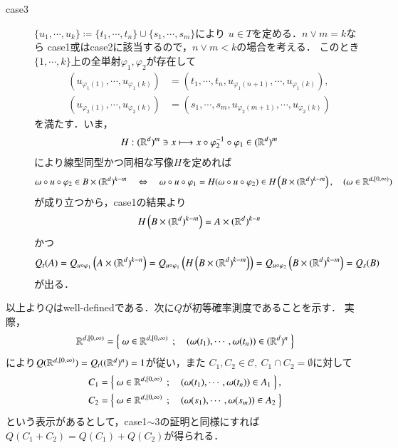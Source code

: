 \begin{prf}
\begin{description}
\begin{description}
					\item[case3]
						$\{u_1,\cdots,u_k\} \coloneqq \{t_1,\cdots,t_n\} \cup \{s_1,\cdots,s_m\}$により
						$u \in T$を定める．$n \vee m=k$なら
						case1或はcase2に該当するので，$n \vee m < k$の場合を考える．
						このとき$\{1,\cdots,k\}$上の全単射$\varphi_1,\varphi_2$が存在して
						\begin{align}
							(u_{\varphi_1(1)},\cdots, u_{\varphi_1(k)})
							&= (t_1, \cdots, t_n,u_{\varphi_1(n+1)},\cdots,u_{\varphi_1(k)}), \\
							(u_{\varphi_2(1)},\cdots, u_{\varphi_2(k)})
							&= (s_1, \cdots, s_m,u_{\varphi_2(m+1)},\cdots,u_{\varphi_2(k)})
						\end{align}
						を満たす．いま，
						\begin{align}
							H:(\mathbb{R}^d)^m \ni x \longmapsto x \circ \varphi_2^{-1} \circ \varphi_1 \in (\mathbb{R}^d)^m
						\end{align}
						により線型同型かつ同相な写像$H$を定めれば
						\begin{align}
							\omega \circ u \circ \varphi_2 \in B \times (\mathbb{R}^d)^{k-m}
							\quad \Leftrightarrow \quad 
							\omega \circ u \circ \varphi_1 
							= H(\omega \circ u \circ \varphi_2) \in H\left( B \times (\mathbb{R}^d)^{k-m} \right),
							\quad (\omega \in \mathbb{R}^{d,[0,\infty)})
						\end{align}
						が成り立つから，case1の結果より
						\begin{align}
							H\left( B \times (\mathbb{R}^d)^{k-m} \right) = A \times (\mathbb{R}^d)^{k-n}
						\end{align}
						かつ
						\begin{align}
							Q_t(A) 
							= Q_{u \circ \varphi_1} \left( A \times (\mathbb{R}^d)^{k-n} \right)
							= Q_{u \circ \varphi_1} \left( H\left( B \times (\mathbb{R}^d)^{k-m} \right) \right)
							= Q_{u \circ \varphi_2} \left( B \times (\mathbb{R}^d)^{k-m} \right)
							= Q_s(B)
						\end{align}
						が出る．
				\end{description}
				以上より$Q$はwell-definedである．次に$Q$が初等確率測度であることを示す．
				実際，
				\begin{align}
					\mathbb{R}^{d,[0,\infty)} = \left\{\ \omega \in \mathbb{R}^{d,[0,\infty)}\ \, ; \quad (\omega(t_1),\cdots,\omega(t_n)) \in (\mathbb{R}^d)^n\ \right\}
				\end{align}
				により$Q(\mathbb{R}^{d,[0,\infty)}) = Q_t((\mathbb{R}^d)^n) = 1$が従い，また
				$C_1,C_2 \in \mathscr{C},\ C_1 \cap C_2 = \emptyset$に対して
				\begin{align}
					C_1 &= \left\{\ \omega \in \mathbb{R}^{d,[0,\infty)}\ \, ; \quad (\omega(t_1),\cdots,\omega(t_n)) \in A_1\ \right\}, \\
					C_2 &= \left\{\ \omega \in \mathbb{R}^{d,[0,\infty)}\ \, ; \quad (\omega(s_1),\cdots,\omega(s_m)) \in A_2\ \right\}
				\end{align}
				という表示があるとして，case1$\sim$3の証明と同様にすれば$Q(C_1 + C_2) = Q(C_1) + Q(C_2)$が得られる．
		\end{description}
	\end{prf}
	
